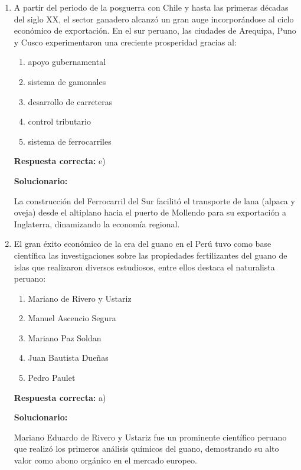 \begin{enumerate}[resume]
	\item A partir del periodo de la posguerra con Chile y hasta las primeras décadas del siglo XX, el sector ganadero alcanzó un gran auge incorporándose al ciclo económico de exportación. En el sur peruano, las ciudades de Arequipa, Puno y Cusco experimentaron una creciente prosperidad gracias al:
	\begin{enumerate}[label=\alph*)]
		\item apoyo gubernamental
		\item sistema de gamonales
		\item desarrollo de carreteras
		\item control tributario
		\item sistema de ferrocarriles
	\end{enumerate}
	\textbf{Respuesta correcta:} e)

	\vspace{2mm}
	\textbf{Solucionario:}

	La construcción del Ferrocarril del Sur facilitó el transporte de lana (alpaca y oveja) desde el altiplano hacia el puerto de Mollendo para su exportación a Inglaterra, dinamizando la economía regional.

	\vspace{6mm}

	\item El gran éxito económico de la era del guano en el Perú tuvo como base científica las investigaciones sobre las propiedades fertilizantes del guano de islas que realizaron diversos estudiosos, entre ellos destaca el naturalista peruano:
	\begin{enumerate}[label=\alph*)]
		\item Mariano de Rivero y Ustariz
		\item Manuel Ascencio Segura
		\item Mariano Paz Soldan
		\item Juan Bautista Dueñas
		\item Pedro Paulet
	\end{enumerate}
	\textbf{Respuesta correcta:} a)

	\vspace{2mm}
	\textbf{Solucionario:}

	Mariano Eduardo de Rivero y Ustariz fue un prominente científico peruano que realizó los primeros análisis químicos del guano, demostrando su alto valor como abono orgánico en el mercado europeo.


\end{enumerate}
